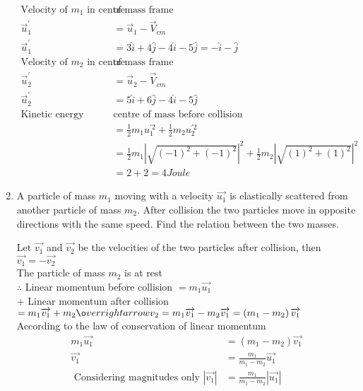 \begin{enumerate}
\begin{answer}
\begin{align*}
	\text{Velocity of $m_1$ in centre }&\text{of mass frame}\\
	\vec{u}_1^{\prime}&=\vec{u}_1-\vec{V}_{cm}\\
	\vec{u}_1^{\prime}&=3\hat{i}+4\hat{j}-4\hat{i}-5\hat{j}=-\hat{i}-\hat{j}\\
	\text{Velocity of $m_2$ in centre }&\text{of mass frame}\\
	\vec{u}_2^{\prime}&=\vec{u}_2-\vec{V}_{cm}\\
	\vec{u}_2^{\prime}&=5\hat{i}+6\hat{j}-4\hat{i}-5\hat{j}\\
	\text{Kinetic energy relative to }&\text{centre of mass before collision}\\
	&=\frac{1}{2}m_1u_1^{\prime 2}+\frac{1}{2}m_2u_2^{\prime 2}\\
	&=\frac{1}{2}m_1|\sqrt{(-1)^2+(-1)^2}|^2+\frac{1}{2}m_2|\sqrt{(1)^2+(1)^2}|^2\\
	&=2+2=4 Joule
	\end{align*}
\end{answer}
\item A particle of mass $m_{1}$ moving with a velocity $\overrightarrow{u_{1}}$ is elastically scattered from another particle of mass $m_{2}$. After collision the two particles move in opposite directions with the same speed. Find the relation between the two masses.
\begin{answer}
	 Let $\overrightarrow{v_{1}}$ and $\overrightarrow{v_{2}}$ be the velocities of the two particles after collision, then\\ $\overrightarrow{v_{1}}=-\overrightarrow{v_{2}}$ \\
	The particle of mass $m_{2}$ is at rest\\
	$\therefore$ Linear momentum before collision $=m_{1} \overrightarrow{u_{1}}$\\
+	Linear momentum after collision $=m_{1} \overrightarrow{v_{1}}+m_{2} \o
verrightarrow{v_{2}}=m_{1} \overrightarrow{v_{1}}-m_{2} \overrightarrow{v_{1}}=\left(m_{1}-m_{2}\right) \overrightarrow{v_{1}}$\\
	According to the law of conservation of linear momentum
	\begin{align*}
	m_{1} \overrightarrow{u_{1}} &=\left(m_{1}-m_{2}\right) \overrightarrow{v_{1}} \\
	\overrightarrow{v_{1}} &=\frac{m_{1}}{m_{1}-m_{2}} \overrightarrow{u_{1}}\\
\text{	Considering magnitudes only } \left|\overrightarrow{v_{1}}\right|&=\frac{m_{1}}{m_{1}-m_{2}}\left|\overrightarrow{u_{1}}\right|\\

\end{align*}
\end{answer}
\end{enumerate}
